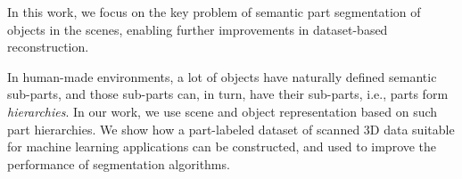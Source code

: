 




In this work, we focus on the key problem of semantic part segmentation of objects in the scenes, enabling further improvements in  dataset-based reconstruction. 


In human-made environments, a lot of objects have naturally defined semantic sub-parts, and those sub-parts can, in turn, have their sub-parts, i.e., parts form \emph{hierarchies}.  In our work, we use scene and object representation based on such part hierarchies.  We show how a part-labeled dataset of scanned 3D data suitable for machine learning applications can be constructed, and used to improve the performance of segmentation algorithms. 

